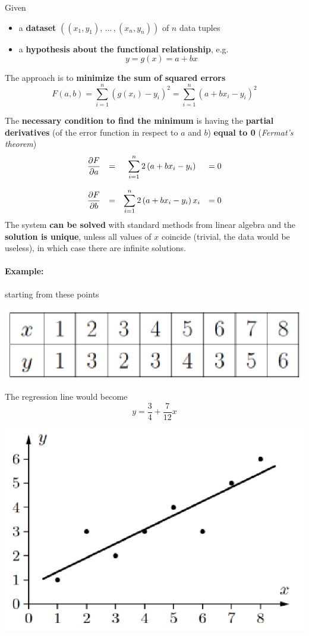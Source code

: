 \documentclass[11pt]{article}
\begin{document}
		Given 
		\begin{itemize}
			\item a \textbf{dataset} $\left((x_1, y_1), \, ... \, , (x_n, y_n) \right)$ of $n$ data tuples
			\item a \textbf{hypothesis about the functional relationship}, e.g. 
			$$y = g(x) = a + bx$$
		\end{itemize}
		
		The approach is to \textbf{minimize the sum of squared errors}
		$$ F(a,b) = \sum_{i=1}^n \left(g(x_i) - y_i \right)^2 = \sum_{i=1}^n \left(a + bx_i - y_i\right)^2 $$
		
		\newpage
		
		The \textbf{necessary condition to find the minimum} is having the \textbf{partial derivatives} (of the error function in respect to $a$ and $b$) \textbf{equal to 0} (\textit{Fermat's theorem})
		$$ \begin{array}{c c c c}
			\displaystyle \frac{\partial F}{\partial a} & = & \displaystyle \sum_{i=1}^n 2 \left(a + b x_i - y_i \right) & = 0 \\
			\hfill \\
			\displaystyle \frac{\partial F}{\partial b} & = & \displaystyle \sum_{i=1}^n 2 \left(a + b x_i - y_i \right)x_i & = 0
		\end{array} $$
		The system \textbf{can be solved} with standard methods from linear algebra and the \textbf{solution is unique}, unless all values of $x$ coincide (trivial, the data would be useless), in which case there are infinite solutions.\\
		
		\paragraph{Example:} starting from these points
		\begin{center}
			\includegraphics[width=0.45\columnwidth]{img/NN/linreg1}
		\end{center}
		The regression line would become
		$$ y = \frac{3}{4} + \frac{7}{12} x $$
		\begin{center}
			\includegraphics[width=0.5\columnwidth]{img/NN/linreg2}
		\end{center}
		
\end{document}
